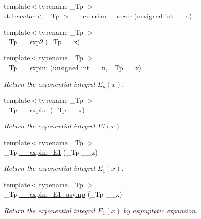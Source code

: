 \begin{DoxyCompactItemize}
\item 
{\footnotesize template$<$typename \+\_\+\+Tp $>$ }\\std\+::vector$<$ \+\_\+\+Tp $>$ \hyperlink{namespacestd_1_1____detail_a5609870200a041b3ace18c15e212a275}{\+\_\+\+\_\+eulerian\+\_\+\_\+recur} (unsigned int \+\_\+\+\_\+n)
\item 
{\footnotesize template$<$typename \+\_\+\+Tp $>$ }\\\+\_\+\+Tp \hyperlink{namespacestd_1_1____detail_a51c70764063ef329a4ab96f837c99faf}{\+\_\+\+\_\+exp2} (\+\_\+\+Tp \+\_\+\+\_\+x)
\item 
{\footnotesize template$<$typename \+\_\+\+Tp $>$ }\\\+\_\+\+Tp \hyperlink{namespacestd_1_1____detail_a0282700710ec07b8ca095fe2ec140d6e}{\+\_\+\+\_\+expint} (unsigned int \+\_\+\+\_\+n, \+\_\+\+Tp \+\_\+\+\_\+x)
\begin{DoxyCompactList}\small\item\em Return the exponential integral $ E_n(x) $. \end{DoxyCompactList}\item 
{\footnotesize template$<$typename \+\_\+\+Tp $>$ }\\\+\_\+\+Tp \hyperlink{namespacestd_1_1____detail_abefd4102ce8a673604204e360074ceaa}{\+\_\+\+\_\+expint} (\+\_\+\+Tp \+\_\+\+\_\+x)
\begin{DoxyCompactList}\small\item\em Return the exponential integral $ Ei(x) $. \end{DoxyCompactList}\item 
{\footnotesize template$<$typename \+\_\+\+Tp $>$ }\\\+\_\+\+Tp \hyperlink{namespacestd_1_1____detail_a665eb0c524b929c035d88bbb17815917}{\+\_\+\+\_\+expint\+\_\+\+E1} (\+\_\+\+Tp \+\_\+\+\_\+x)
\begin{DoxyCompactList}\small\item\em Return the exponential integral $ E_1(x) $. \end{DoxyCompactList}\item 
{\footnotesize template$<$typename \+\_\+\+Tp $>$ }\\\+\_\+\+Tp \hyperlink{namespacestd_1_1____detail_abd02a300cd209be618a6e054a706c012}{\+\_\+\+\_\+expint\+\_\+\+E1\+\_\+asymp} (\+\_\+\+Tp \+\_\+\+\_\+x)
\begin{DoxyCompactList}\small\item\em Return the exponential integral $ E_1(x) $ by asymptotic expansion. \end{DoxyCompactList}\item 

\end{DoxyCompactItemize}
